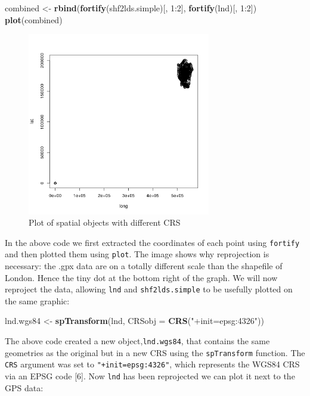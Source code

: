 \documentclass[]{article}
\newenvironment{Shaded}{}{}
\newcommand{\KeywordTok}[1]{\textcolor[rgb]{0.00,0.44,0.13}{\textbf{{#1}}}}
\newcommand{\DataTypeTok}[1]{\textcolor[rgb]{0.56,0.13,0.00}{{#1}}}
\newcommand{\DecValTok}[1]{\textcolor[rgb]{0.25,0.63,0.44}{{#1}}}
\newcommand{\StringTok}[1]{\textcolor[rgb]{0.25,0.44,0.63}{{#1}}}
\newcommand{\NormalTok}[1]{{#1}}
\let\Oldincludegraphics\includegraphics
\renewcommand{\includegraphics}[1]{\Oldincludegraphics[width=8cm]{#1}}
\begin{document}
\begin{Shaded}
\begin{Highlighting}[]
\NormalTok{combined <- }\KeywordTok{rbind}\NormalTok{(}\KeywordTok{fortify}\NormalTok{(shf2lds.simple)[, }\DecValTok{1}\NormalTok{:}\DecValTok{2}\NormalTok{], }\KeywordTok{fortify}\NormalTok{(lnd)[, }\DecValTok{1}\NormalTok{:}\DecValTok{2}\NormalTok{])}
\KeywordTok{plot}\NormalTok{(combined)}
\end{Highlighting}
\end{Shaded}
\begin{figure}[htbp]
\centering
\includegraphics{figure/Plot_of_spatial_objects_with_different_CRS.png}
\caption{Plot of spatial objects with different CRS}
\end{figure}

In the above code we first extracted the coordinates of each point using
\texttt{fortify} and then plotted them using \texttt{plot}. The image
shows why reprojection is necessary: the .gpx data are on a totally
different scale than the shapefile of London. Hence the tiny dot at the
bottom right of the graph. We will now reproject the data, allowing
\texttt{lnd} and \texttt{shf2lds.simple} to be usefully plotted on the
same graphic:

\begin{Shaded}
\begin{Highlighting}[]
\NormalTok{lnd.wgs84 <- }\KeywordTok{spTransform}\NormalTok{(lnd, }\DataTypeTok{CRSobj =} \KeywordTok{CRS}\NormalTok{(}\StringTok{"+init=epsg:4326"}\NormalTok{))}
\end{Highlighting}
\end{Shaded}
The above code created a new object,\texttt{lnd.wgs84}, that contains
the same geometries as the original but in a new CRS using the
\texttt{spTransform} function. The \texttt{CRS} argument was set to
\texttt{"+init=epsg:4326"}, which represents the WGS84 CRS via an EPSG
code {[}6{]}. Now \texttt{lnd} has been reprojected we can plot it next
to the GPS data:
\end{document}
